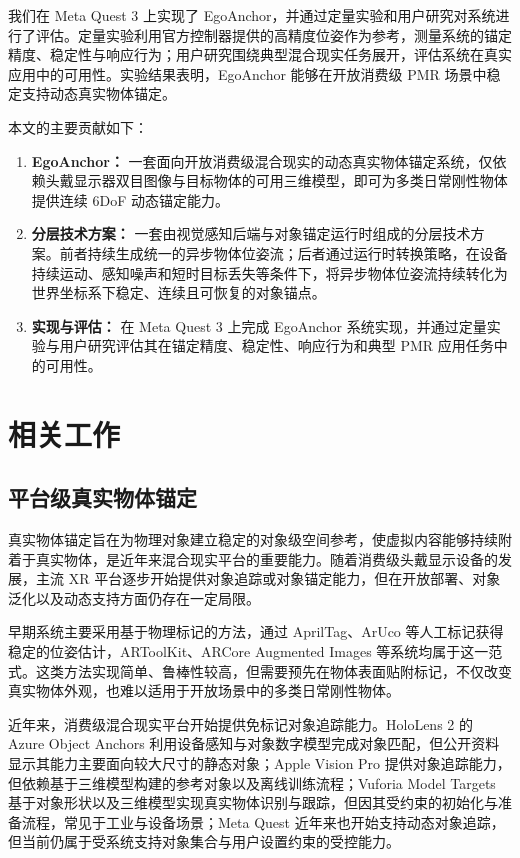 \documentclass[review]{vgtc}
\begin{document}
我们在 Meta Quest 3 上实现了 EgoAnchor，并通过定量实验和用户研究对系统进行了评估。定量实验利用官方控制器提供的高精度位姿作为参考，测量系统的锚定精度、稳定性与响应行为；用户研究围绕典型混合现实任务展开，评估系统在真实应用中的可用性。实验结果表明，EgoAnchor 能够在开放消费级 PMR 场景中稳定支持动态真实物体锚定。

本文的主要贡献如下：

\begin{enumerate}
  \item \textbf{EgoAnchor：} 一套面向开放消费级混合现实的动态真实物体锚定系统，仅依赖头戴显示器双目图像与目标物体的可用三维模型，即可为多类日常刚性物体提供连续 6DoF 动态锚定能力。
  \item \textbf{分层技术方案：} 一套由视觉感知后端与对象锚定运行时组成的分层技术方案。前者持续生成统一的异步物体位姿流；后者通过运行时转换策略，在设备持续运动、感知噪声和短时目标丢失等条件下，将异步物体位姿流持续转化为世界坐标系下稳定、连续且可恢复的对象锚点。
  \item \textbf{实现与评估：} 在 Meta Quest 3 上完成 EgoAnchor 系统实现，并通过定量实验与用户研究评估其在锚定精度、稳定性、响应行为和典型 PMR 应用任务中的可用性。
\end{enumerate}

\section{相关工作}\label{sec:related-work}


\subsection{平台级真实物体锚定}


真实物体锚定旨在为物理对象建立稳定的对象级空间参考，使虚拟内容能够持续附着于真实物体，是近年来混合现实平台的重要能力。随着消费级头戴显示设备的发展，主流 XR 平台逐步开始提供对象追踪或对象锚定能力，但在开放部署、对象泛化以及动态支持方面仍存在一定局限。

早期系统主要采用基于物理标记的方法，通过 AprilTag、ArUco 等人工标记获得稳定的位姿估计，ARToolKit、ARCore Augmented Images 等系统均属于这一范式。这类方法实现简单、鲁棒性较高，但需要预先在物体表面贴附标记，不仅改变真实物体外观，也难以适用于开放场景中的多类日常刚性物体。

近年来，消费级混合现实平台开始提供免标记对象追踪能力。HoloLens 2 的 Azure Object Anchors 利用设备感知与对象数字模型完成对象匹配，但公开资料显示其能力主要面向较大尺寸的静态对象；Apple Vision Pro 提供对象追踪能力，但依赖基于三维模型构建的参考对象以及离线训练流程；Vuforia Model Targets 基于对象形状以及三维模型实现真实物体识别与跟踪，但因其受约束的初始化与准备流程，常见于工业与设备场景；Meta Quest 近年来也开始支持动态对象追踪，但当前仍属于受系统支持对象集合与用户设置约束的受控能力。
\end{document}
